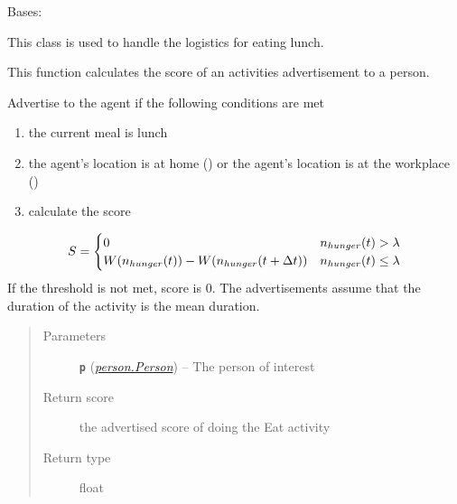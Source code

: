 \documentclass[letterpaper,10pt,english]{sphinxmanual}
\begin{document}

\begin{fulllineitems}
\label{eat:eat.Eat_Lunch}
Bases: {\hyperref[eat:eat.Eat]{\emph{}}}

This class is used to handle the logistics for eating lunch.

\begin{fulllineitems}
\label{eat:eat.Eat_Lunch.advertise}
This function calculates the score of an activities advertisement to a person.

Advertise to the agent if the following conditions are met
\begin{enumerate}
\item {} 
the current meal is lunch

\item {} 
the agent's location is at home () or the agent's location is at the         workplace ()

\item {} 
calculate the score

\end{enumerate}
\begin{gather}
\begin{split}S = \begin{cases}
0  & n_{hunger}(t) > \lambda \\
W( n_{hunger}(t) ) - W( n_{hunger}(t + \Delta{t} )) & n_{hunger}(t) \le \lambda
\end{cases}\end{split}\notag
\end{gather}
If the threshold is not met, score is 0. The advertisements assume that the duration         of the activity is the mean duration.
\begin{quote}\begin{description}
\item[{Parameters}] \leavevmode
\textbf{\texttt{p}} ({\hyperref[person:person.Person]{\emph{\emph{person.Person}}}}) -- The person of interest

\item[{Return score}] \leavevmode
the advertised score of doing the Eat activity

\item[{Return type}] \leavevmode
float


\end{description}
\end{quote}
\end{fulllineitems}
\end{fulllineitems}
\end{document}
